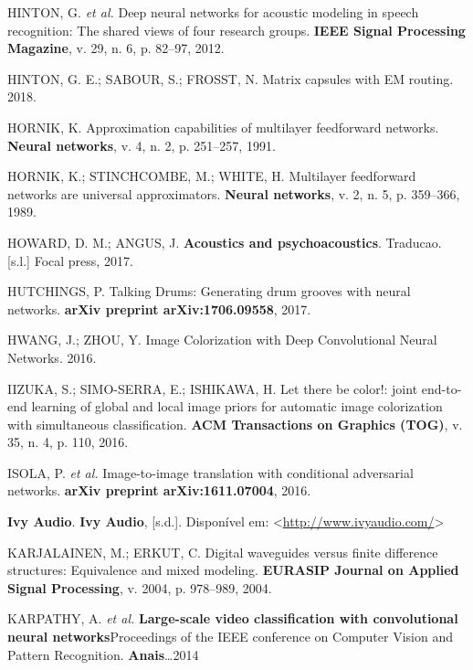 \documentclass[]{article}
\begin{document}
\leavevmode\hypertarget{ref-hinton2012deep}{}%
HINTON, G. \emph{et al.} Deep neural networks for acoustic modeling in
speech recognition: The shared views of four research groups.
\textbf{IEEE Signal Processing Magazine}, v. 29, n. 6, p. 82--97, 2012.

\leavevmode\hypertarget{ref-hinton2018matrix}{}%
HINTON, G. E.; SABOUR, S.; FROSST, N. Matrix capsules with EM routing.
2018.

\leavevmode\hypertarget{ref-hornik91}{}%
HORNIK, K. Approximation capabilities of multilayer feedforward
networks. \textbf{Neural networks}, v. 4, n. 2, p. 251--257, 1991.

\leavevmode\hypertarget{ref-hornik89}{}%
HORNIK, K.; STINCHCOMBE, M.; WHITE, H. Multilayer feedforward networks
are universal approximators. \textbf{Neural networks}, v. 2, n. 5, p.
359--366, 1989.

\leavevmode\hypertarget{ref-howard2017acoustics}{}%
HOWARD, D. M.; ANGUS, J. \textbf{Acoustics and psychoacoustics}.
Traducao. {[}s.l.{]} Focal press, 2017.

\leavevmode\hypertarget{ref-hutchings2017talking}{}%
HUTCHINGS, P. Talking Drums: Generating drum grooves with neural
networks. \textbf{arXiv preprint arXiv:1706.09558}, 2017.

\leavevmode\hypertarget{ref-hwangimage}{}%
HWANG, J.; ZHOU, Y. Image Colorization with Deep Convolutional Neural
Networks. 2016.

\leavevmode\hypertarget{ref-iizuka2016let}{}%
IIZUKA, S.; SIMO-SERRA, E.; ISHIKAWA, H. Let there be color!: joint
end-to-end learning of global and local image priors for automatic image
colorization with simultaneous classification. \textbf{ACM Transactions
on Graphics (TOG)}, v. 35, n. 4, p. 110, 2016.

\leavevmode\hypertarget{ref-isola2016image}{}%
ISOLA, P. \emph{et al.} Image-to-image translation with conditional
adversarial networks. \textbf{arXiv preprint arXiv:1611.07004}, 2016.

\leavevmode\hypertarget{ref-ivy_audio}{}%
\textbf{Ivy Audio}. \textbf{Ivy Audio}, {[}s.d.{]}. Disponível em:
\textless{}\url{http://www.ivyaudio.com/}\textgreater{}

\leavevmode\hypertarget{ref-karjalainen2004digital}{}%
KARJALAINEN, M.; ERKUT, C. Digital waveguides versus finite difference
structures: Equivalence and mixed modeling. \textbf{EURASIP Journal on
Applied Signal Processing}, v. 2004, p. 978--989, 2004.

\leavevmode\hypertarget{ref-karpathy2014large}{}%
KARPATHY, A. \emph{et al.} \textbf{Large-scale video classification with
convolutional neural networks}Proceedings of the IEEE conference on
Computer Vision and Pattern Recognition. \textbf{Anais}\ldots{}2014
\end{document}

